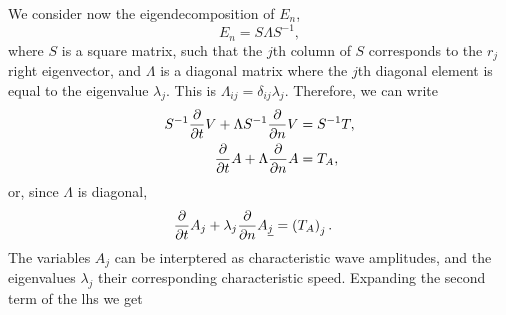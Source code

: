 We consider now the eigendecomposition of $E_n$,
\begin{equation}
E_n = S \Lambda S^{-1},
\end{equation}
where $S$ is a square matrix, such that the $j$th column of $S$ corresponds to
the $r_j$ right eigenvector, and $\Lambda$ is a diagonal matrix where the
$j$th diagonal element is equal to the eigenvalue $\lambda_j$. This is
$\Lambda_{ij}=\delta_{ij} \lambda_j$. Therefore, we can write 
%
\begin{align}
  S^{-1} \frac{\partial }{\partial t}V
  +  \Lambda S^{-1} \frac{\partial }{\partial n}V
  &= S^{-1} T, \\
  \frac{\partial }{\partial t}A
  + \Lambda \frac{\partial }{\partial n}A
  &= T_A,
\end{align}
%
or, since $\Lambda$ is diagonal,
%
\begin{align}
  \frac{\partial }{\partial t}A_j
  + \lambda_j \frac{\partial }{\partial n}A_{\underline{j}}
  &= \left(T_A\right)_j.
\end{align}
%
The variables $A_j$ can be interptered as characteristic wave amplitudes, and
the eigenvalues $\lambda_j$ their corresponding characteristic speed.
Expanding the second term of the lhs we get
%
